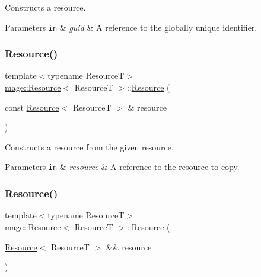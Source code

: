 Constructs a resource.


\begin{DoxyParams}[1]{Parameters}
\mbox{\tt in}  & {\em guid} & A reference to the globally unique identifier. \\
\hline
\end{DoxyParams}
\hypertarget{classmage_1_1_resource_a53da586d9bae285ab50c4cca2421a9ce}{}\label{classmage_1_1_resource_a53da586d9bae285ab50c4cca2421a9ce} 
\subsubsection{\texorpdfstring{Resource()}{Resource()}\hspace{0.1cm}{\footnotesize\ttfamily [2/3]}}
{\footnotesize\ttfamily template$<$typename ResourceT$>$ \\
\hyperlink{classmage_1_1_resource}{mage\+::\+Resource}$<$ ResourceT $>$\+::\hyperlink{classmage_1_1_resource}{Resource} (\begin{DoxyParamCaption}\item[{const \hyperlink{classmage_1_1_resource}{Resource}$<$ ResourceT $>$ \&}]{resource }\end{DoxyParamCaption})\hspace{0.3cm}{\ttfamily [delete]}}

Constructs a resource from the given resource.


\begin{DoxyParams}[1]{Parameters}
\mbox{\tt in}  & {\em resource} & A reference to the resource to copy. \\
\hline
\end{DoxyParams}
\hypertarget{classmage_1_1_resource_a86216fd0f8072285ad1582e296a8a3fc}{}\label{classmage_1_1_resource_a86216fd0f8072285ad1582e296a8a3fc} 
\subsubsection{\texorpdfstring{Resource()}{Resource()}\hspace{0.1cm}{\footnotesize\ttfamily [3/3]}}
{\footnotesize\ttfamily template$<$typename ResourceT$>$ \\
\hyperlink{classmage_1_1_resource}{mage\+::\+Resource}$<$ ResourceT $>$\+::\hyperlink{classmage_1_1_resource}{Resource} (\begin{DoxyParamCaption}\item[{\hyperlink{classmage_1_1_resource}{Resource}$<$ ResourceT $>$ \&\&}]{resource }\end{DoxyParamCaption})}

